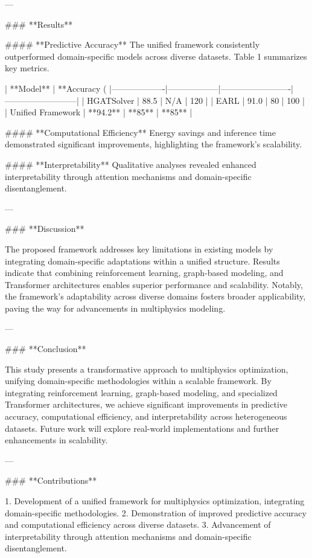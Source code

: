 ---

### **Results**

#### **Predictive Accuracy**
The unified framework consistently outperformed domain-specific models across diverse datasets. Table 1 summarizes key metrics.

| **Model**        | **Accuracy (%
|-------------------|------------------|-------------------------|--------------------------|
| HGATSolver        | 88.5            | N/A                     | 120                      |
| EARL              | 91.0            | 80                      | 100                      |
| Unified Framework | **94.2**        | **85**                  | **85**                   |

#### **Computational Efficiency**
Energy savings and inference time demonstrated significant improvements, highlighting the framework's scalability.

#### **Interpretability**
Qualitative analyses revealed enhanced interpretability through attention mechanisms and domain-specific disentanglement.

---

### **Discussion**

The proposed framework addresses key limitations in existing models by integrating domain-specific adaptations within a unified structure. Results indicate that combining reinforcement learning, graph-based modeling, and Transformer architectures enables superior performance and scalability. Notably, the framework's adaptability across diverse domains fosters broader applicability, paving the way for advancements in multiphysics modeling.

---

### **Conclusion**

This study presents a transformative approach to multiphysics optimization, unifying domain-specific methodologies within a scalable framework. By integrating reinforcement learning, graph-based modeling, and specialized Transformer architectures, we achieve significant improvements in predictive accuracy, computational efficiency, and interpretability across heterogeneous datasets. Future work will explore real-world implementations and further enhancements in scalability.

---

### **Contributions**

1. Development of a unified framework for multiphysics optimization, integrating domain-specific methodologies.
2. Demonstration of improved predictive accuracy and computational efficiency across diverse datasets.
3. Advancement of interpretability through attention mechanisms and domain-specific disentanglement.

